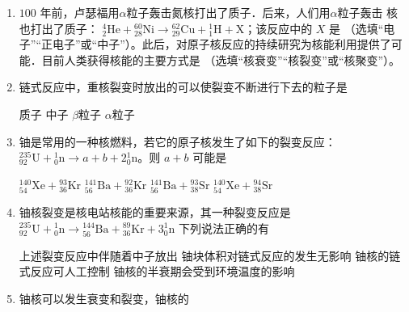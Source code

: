 

\begin{enumerate}
	\item
{}
$ 100 $ 年前，卢瑟福用$ \alpha $粒子轰击氮核打出了质子．后来，人们用$ \alpha $粒子轰击   
核也打出了质子： ${ }_{2}^{4} \mathrm{He}+{ }_{28}^{60} \mathrm{Ni} \rightarrow{ }_{29}^{62} \mathrm{Cu}+{ }_{1}^{1} \mathrm{H}+\mathrm{X}$；该反应中的 $ X $ 是 \underlinegap （选填“电子”“正电子”或“中子”）。此后，对原子核反应的持续研究为核能利用提供了可能．目前人类获得核能的主要方式是
 \underlinegap 
（选填“核衰变”“核裂变”或“核聚变”）。





\item
{}
链式反应中，重核裂变时放出的可以使裂变不断进行下去的粒子是  

\fourchoices
{质子}
{中子}
{$ \beta $粒子}
{$ \alpha $粒子}




\item 
{}
铀是常用的一种核燃料，若它的原子核发生了如下的裂变反应：${ }_{92}^{235} \mathrm{U}+{ }_{0}^{1} \mathrm{n} \rightarrow a+b+2{ }_{0}^{1} \mathrm{n}$。则 $ a+b $ 可能是  

\fourchoices
{${ }_{54}^{140} \mathrm{Xe}+{ }_{36}^{93} \mathrm{Kr}$}
{${ }_{56}^{141} \mathrm{Ba}+{ }_{36}^{92} \mathrm{Kr}$}
{${ }_{56}^{141} \mathrm{Ba}+{ }_{38}^{93} \mathrm{Sr}$}
{${ }_{54}^{140} \mathrm{Xe}+{ }_{38}^{94} \mathrm{Sr}$}



\item 
{}
铀核裂变是核电站核能的重要来源，其一种裂变反应是
${ }_{92}^{235} \mathrm{U}+{ }_{0}^{1} \mathrm{n} \rightarrow{ }_{56}^{144} \mathrm{Ba}+{ }_{36}^{89} \mathrm{Kr}+3{ }_{0}^{1} \mathrm{n}$
下列说法正确的有  

\fourchoices
{上述裂变反应中伴随着中子放出}
{铀块体积对链式反应的发生无影响}
{铀核的链式反应可人工控制}
{铀核的半衰期会受到环境温度的影响}



\item 
{}
铀核可以发生衰变和裂变，铀核的  



\end{enumerate}
